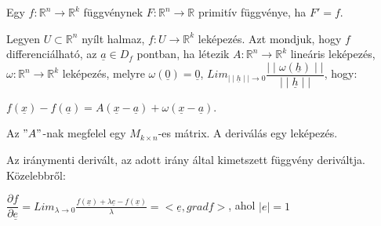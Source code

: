 \documentclass[11pt,a4paper]{article}
\begin{document}
\begin{tcolorbox}[colback=blue!5!white,colframe=blue!70!black,title= 1. Primitív függvény]
Egy \(f : \mathbb{R}^n \to \mathbb{R}^k\) függvénynek \(F: \mathbb{R}^n \to \mathbb{R}\) primitív függvénye, ha \(F'= f\).
\end{tcolorbox}
\begin{tcolorbox}[colback=blue!5!white,colframe=blue!70!black,title= 2. \(\mathbb{R}^n \to \mathbb{R}^k \) leképezés differenciálhatósága]
    Legyen \(U \subset \mathbb{R}^n\) nyílt halmaz, \(f : U \to \mathbb{R}^k\) leképezés. Azt mondjuk, hogy \(f\) differenciálható, az \(\underline{a} \in D_f\) pontban,
    ha létezik \(A: \mathbb{R}^n \to \mathbb{R}^k\) lineáris leképezés, \(\omega : \mathbb{R}^n \to \mathbb{R}^k\) leképezés, melyre \(\omega(\underline{0}) = \underline{0}\), \(Lim_{\mid\mid \underline{h}\mid \mid \to 0} \dfrac{\mid \mid \omega(\underline{h})\mid\mid}{\mid \mid \underline{h} \mid \mid}\),
    hogy:\\
    \begin{center}
        \(f(\underline{x}) - f(\underline{a}) = A(\underline{x} - \underline{a}) + \omega(\underline{x}- \underline{a})\). 
    \end{center}
    Az \("A"\)-nak megfelel egy \(M_{k\times n}\)-es mátrix. A deriválás egy leképezés.
\end{tcolorbox}
\begin{tcolorbox}[colback=blue!5!white,colframe=blue!70!black,title= 3. Iránymenti derivált]
    Az iránymenti derivált, az adott irány által kimetszett függvény deriváltja. Közelebbről:
    \begin{center}
        \(\dfrac{\partial f}{\partial \underline{e}} = Lim_{\lambda \to 0} \frac{f(\underline{x})+ \lambda \underline{e} - f(\underline{x})}{\lambda} = <\underline{e}, gradf>\), ahol \(\mid e\mid = 1\)
    \end{center}
    \begin{center}
        \\
    \end{center}
\end{tcolorbox}
\end{document}
